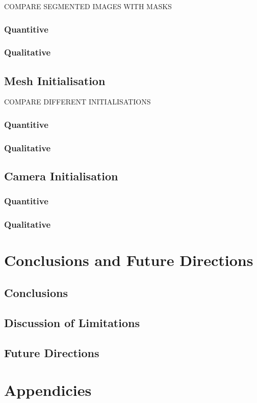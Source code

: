 \documentclass{article}
\begin{document}
COMPARE SEGMENTED IMAGES WITH MASKS

\subsubsection{Quantitive}
\subsubsection{Qualitative}

\subsection{Mesh Initialisation}

COMPARE DIFFERENT INITIALISATIONS

\subsubsection{Quantitive}
\subsubsection{Qualitative}

\subsection{Camera Initialisation}
\subsubsection{Quantitive}
\subsubsection{Qualitative}

\newpage
\section{Conclusions and Future Directions}
\subsection{Conclusions}
\subsection{Discussion of Limitations}
\subsection{Future Directions}
\newpage
\printbibliography[
  heading=bibintoc,
  title={References}
]
\newpage
\section*{Appendicies}
\newpage
\end{document}
